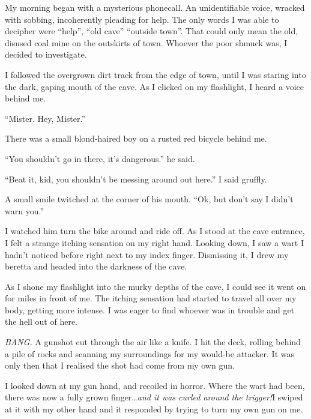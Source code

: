 My morning began with a mysterious phonecall. An unidentifiable
voice, wracked with sobbing, incoherently pleading for help. The
only words I was able to decipher were ``help'', ``old cave'' ``outside
town''. That could only mean the old, disused coal mine on the
outskirts of town. Whoever the poor shmuck was, I decided to
investigate.



I followed the overgrown dirt track from the edge of town, until I
was staring into the dark, gaping mouth of the cave. As I clicked
on my flashlight, I heard a voice behind me.



``Mister. Hey, Mister.''



There was a small blond-haired boy on a rusted red bicycle behind
me.



``You shouldn't go in there, it's dangerous.'' he said.



``Beat it, kid, you shouldn't be messing around out here.'' I said
gruffly.



A small smile twitched at the corner of his mouth. ``Ok, but don't
say I didn't warn you.''



I watched him turn the bike around and ride off. As I stood at the
cave entrance, I felt a strange itching sensation on my right hand.
Looking down, I saw a wart I hadn't noticed before right next to my
index finger. Dismissing it, I drew my beretta and headed into the
darkness of the cave.





As I shone my flashlight into the murky depths of the cave, I could
see it went on for miles in front of me. The itching sensation had
started to travel all over my body, getting more intense. I was
eager to find whoever was in trouble and get the hell out of
here.



{\em BANG.} A gunshot cut through the air like a knife. I hit the
deck, rolling behind a pile of rocks and scanning my surroundings
for my would-be attacker. It was only then that I realised the shot
had come from my own gun.



I looked down at my gun hand, and recoiled in horror. Where the
wart had been, there was now a fully grown finger{\ldots}{\em and it was
curled around the trigger!}I swiped at it with my other hand and
it responded by trying to turn my own gun on me.



